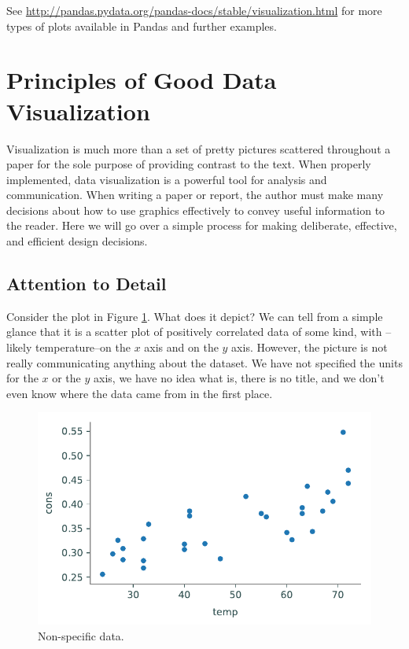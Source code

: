 See \url{http://pandas.pydata.org/pandas-docs/stable/visualization.html} for more types of plots available in Pandas and further examples.

\section*{Principles of Good Data Visualization} %

Visualization is much more than a set of pretty pictures scattered throughout a paper for the sole purpose of providing contrast to the text.
When properly implemented, data visualization is a powerful tool for analysis and communication.
When writing a paper or report, the author must make many decisions about how to use graphics effectively to convey useful information to the reader.
Here we will go over a simple process for making deliberate, effective, and efficient design decisions.

\subsection*{Attention to Detail} %

Consider the plot in Figure \ref{fig:nolabels}.
What does it depict?
We can tell from a simple glance that it is a scatter plot of positively correlated data of some kind, with --likely temperature--on the $x$ axis and  on the $y$ axis.
However, the picture is not really communicating anything about the dataset.
We have not specified the units for the $x$ or the $y$ axis, we have no idea what  is, there is no title, and we don't even know where the data came from in the first place.

\begin{figure}[H]
    \centering
    \includegraphics[width=.7\textwidth]{figures/ice_cream_bad.pdf}
    \caption{Non-specific data.}
    \label{fig:nolabels}
\end{figure}

